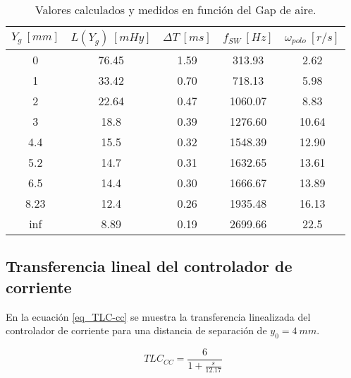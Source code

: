 \begin{table}[H]
	\begin{center}
		\begin{tabular}{| c | c | c | c | c |}
			\hline
			$Y_g\:[mm]$ & $L(Y_g)\:[mHy]$ & $\Delta T\:[ms]$ & $f_{SW}\:[Hz]$ & $\omega _{polo}\:[r/s]$\\ \hline
			0 & 76.45 & 1.59 & 313.93 & 2.62\\ \hline
			1 & 33.42 & 0.70 & 718.13 & 5.98\\ \hline
			2 & 22.64 &	0.47 & 1060.07 & 8.83\\ \hline
			3 &	18.8 & 0.39 & 1276.60 & 10.64\\ \hline
			4.4 & 15.5 & 0.32 & 1548.39 & 12.90\\ \hline
			5.2 & 14.7 & 0.31 & 1632.65 & 13.61\\ \hline
			6.5 & 14.4 & 0.30 & 1666.67 & 13.89\\ \hline
			8.23 & 12.4 & 0.26 & 1935.48 & 16.13\\ \hline
			inf & 8.89 & 0.19 & 2699.66 & 22.5	\\ \hline
		\end{tabular}
		\caption{Valores calculados y medidos en función del Gap de aire.}
		\label{tab_mediciones}
	\end{center}
\end{table}

\subsection{Transferencia lineal del controlador de corriente}

\noindent En la ecuación \ref{eq_TLC-cc} se muestra la transferencia linealizada del controlador de corriente para una distancia de separación de $y_{0}=4\:mm$.

\begin{equation} \label{eq_TLC-cc}
TLC_{CC} = \frac{6}{1+\frac{s}{12.17}}
\end{equation}


